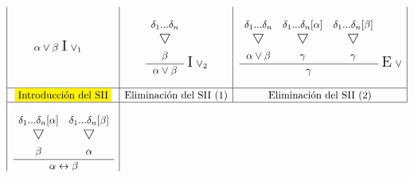\documentclass[a4paper,12pt]{article}
\newcommand\triangulo{\scaleobj{1.3}{\bigtriangledown}}
\begin{document}
\begin{equation*}
\begin{array}{|c|c|c|}
\begin{matrix}
{\begin{matrix}
    \end{matrix}}{\alpha \vee \beta}
  \ \text{\Large I}\ \vee_1
\end{matrix}
&
\begin{matrix}
  \\
  \cfrac{
    \begin{matrix}
      \begin{array}{c}
        \delta_1 ... \delta_n\\
          \triangulo \vspace{2mm}\\
        \beta
      \end{array} \\
    \end{matrix}}{\alpha \vee \beta}
  \ \text{\Large I}\ \vee_2
  \\
  \ 
\end{matrix}
&
 \begin{matrix}
  \cfrac{
    \begin{matrix}
      \begin{array}{ccc}
      \ \\
        \delta_1 ... \delta_n & \delta_1 ... \delta_n [\alpha] & \delta_1 ... \delta_n [\beta] \\
        \triangulo & \triangulo & \triangulo \vspace{2mm}\\
        \alpha \vee \beta & \gamma & \gamma
      \end{array} \\
    \end{matrix}}{\gamma}
  \ \text{\Large E}\ \vee \\
  \ 
\end{matrix}
\\ \hline
    \colorbox{yellow}{Introducción del SII} &
    \text{Eliminación del SII (1)} &
    \text{Eliminación del SII (2)}
\\ \hline
\begin{matrix}
  \cfrac{
    \begin{matrix}
      \begin{array}{cc}
      \ \\
        \delta_1 ... \delta_n [\alpha]& \delta_1 ... \delta_n [\beta]\\
        \triangulo & \triangulo \vspace{2mm}\\
        \beta & \alpha
      \end{array} \\
    \end{matrix}}{\alpha \leftrightarrow \beta}

\end{matrix}
\end{array}
\end{equation*}
\end{document}
